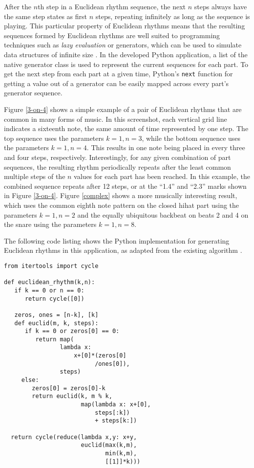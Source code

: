 \documentclass{sig-alternate-05-2015}
\begin{document}
After the $n$th step in a Euclidean rhythm sequence, the next $n$ steps always have the same step states as first $n$ steps, repeating infinitely as long as the sequence is playing. This particular property of Euclidean rhythms means that the resulting sequences formed by Euclidean rhythms are well suited to programming techniques such as \textit{lazy evaluation} or generators, which can be used to simulate data structures of infinite size \cite{henderson1976lazy}. In the developed Python application, a list of the native generator class is used to represent the current sequences for each part. To get the next step from each part at a given time, Python's \texttt{next} function for getting a value out of a generator can be easily mapped across every part's generator sequence.

Figure \ref{3-on-4} shows a simple example of a pair of Euclidean rhythms that are common in many forms of music. In this screenshot, each vertical grid line indicates a sixteenth note, the same amount of time represented by one step. The top sequence uses the parameters $k=1, n=3$, while the bottom sequence uses the parameters $k=1, n=4$. This results in one note being placed in every three and four steps, respectively. Interestingly, for any given combination of part sequences, the resulting rhythm periodically repeats after the least common multiple steps of the $n$ values for each part has been reached. In this example, the combined sequence repeats after 12 steps, or at the ``1.4'' and ``2.3'' marks shown in Figure \ref{3-on-4}. Figure \ref{complex} shows a more musically interesting result, which uses the common eighth note pattern on the closed hihat part using the parameters $k=1, n=2$ and the equally ubiquitous backbeat on beats 2 and 4 on the snare using the parameters $k=1, n=8$. 

The following code listing shows the Python implementation for generating Euclidean rhythms in this application, as adapted from the existing algorithm \cite{toussaint2005euclidean}.

\lstset{language=Python} 
\begin{lstlisting}
from itertools import cycle

def euclidean_rhythm(k,n):
   if k == 0 or n == 0: 
      return cycle([0])

   zeros, ones = [n-k], [k]
   def euclid(m, k, steps):
      if k == 0 or zeros[0] == 0: 
         return map(
                lambda x: 
                    x+[0]*(zeros[0]
                          /ones[0]), 
                steps)
     else:      
        zeros[0] = zeros[0]-k
        return euclid(k, m % k,
                      map(lambda x: x+[0], 
                          steps[:k]) 
                          + steps[k:])

  return cycle(reduce(lambda x,y: x+y, 
                      euclid(max(k,m), 
                             min(k,m), 
                             [[1]]*k)))
\end{lstlisting}
\end{document}
